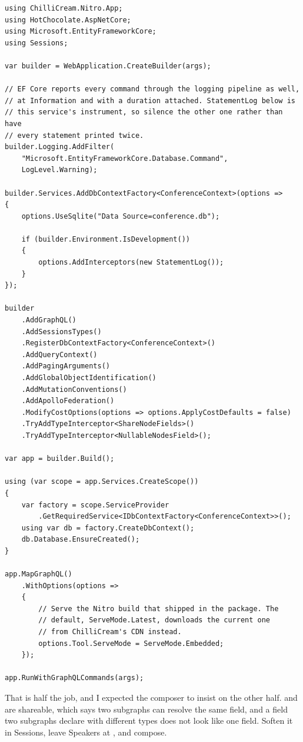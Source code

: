 \begin{verbatim}
using ChilliCream.Nitro.App;
using HotChocolate.AspNetCore;
using Microsoft.EntityFrameworkCore;
using Sessions;

var builder = WebApplication.CreateBuilder(args);

// EF Core reports every command through the logging pipeline as well,
// at Information and with a duration attached. StatementLog below is
// this service's instrument, so silence the other one rather than have
// every statement printed twice.
builder.Logging.AddFilter(
    "Microsoft.EntityFrameworkCore.Database.Command",
    LogLevel.Warning);

builder.Services.AddDbContextFactory<ConferenceContext>(options =>
{
    options.UseSqlite("Data Source=conference.db");

    if (builder.Environment.IsDevelopment())
    {
        options.AddInterceptors(new StatementLog());
    }
});

builder
    .AddGraphQL()
    .AddSessionsTypes()
    .RegisterDbContextFactory<ConferenceContext>()
    .AddQueryContext()
    .AddPagingArguments()
    .AddGlobalObjectIdentification()
    .AddMutationConventions()
    .AddApolloFederation()
    .ModifyCostOptions(options => options.ApplyCostDefaults = false)
    .TryAddTypeInterceptor<ShareNodeFields>()
    .TryAddTypeInterceptor<NullableNodesField>();

var app = builder.Build();

using (var scope = app.Services.CreateScope())
{
    var factory = scope.ServiceProvider
        .GetRequiredService<IDbContextFactory<ConferenceContext>>();
    using var db = factory.CreateDbContext();
    db.Database.EnsureCreated();
}

app.MapGraphQL()
    .WithOptions(options =>
    {
        // Serve the Nitro build that shipped in the package. The
        // default, ServeMode.Latest, downloads the current one
        // from ChilliCream's CDN instead.
        options.Tool.ServeMode = ServeMode.Embedded;
    });

app.RunWithGraphQLCommands(args);
\end{verbatim}

%
That is half the job, and I expected the composer to insist on the other half.
 and  are shareable, which says two subgraphs can
resolve the same field, and a field two subgraphs declare with different types
does not look like one field. Soften it in Sessions, leave Speakers at
\code{[Node]!}, and compose.

